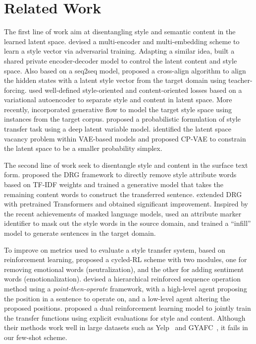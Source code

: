 \section{Related Work}
\label{sec:related}
The first line of work aim at disentangling style and semantic content in the learned latent space. \citet{fu2018style} devised a multi-encoder and multi-embedding scheme to learn a style vector via adversarial training. Adapting a similar idea, \citet{zhang2018shaped} built a shared private encoder-decoder model to control the latent content and style space. Also based on a seq2seq model, \citet{shen2017style} proposed a cross-align algorithm to align the hidden states with a latent style vector from the target domain using teacher-forcing.  \citet{john2018disentangled} used well-defined style-oriented and content-oriented losses based on a variational autoencoder to separate style and content in latent space. More recently, \citet{Yi2019} incorporated generative flow to model the target style space using instances from the target corpus. \citet{he2020probabilistic} proposed a probabilistic formulation of style transfer task using a deep latent variable model. \citet{Xu2019} identified the latent space vacancy problem within VAE-based models and proposed CP-VAE to constrain the latent space to be a smaller probability simplex.

The second line of work seek to disentangle style and content in the surface text form. \citet{li2018delete} proposed the DRG framework to directly remove style attribute words based on TF-IDF weights and trained a generative model that takes the remaining content words to construct the transferred sentence. \citet{Sudhakar2020} extended DRG with pretrained Transformers and obtained significant improvement. Inspired by the recent achievements of masked language models, \citet{wu2019mask} used an attribute marker identifier to mask out the style words in the source domain, and trained a ``infill'' model to generate sentences in the target domain.

To improve on metrics used to evaluate a style transfer system, based on reinforcement learning, \citet{xu2018unpaired} proposed a cycled-RL scheme with two modules, one for removing emotional words (neutralization), and the other for adding sentiment words (emotionalization). \citet{wu2019hierarchical} devised a hierarchical reinforced sequence operation method using a \emph{point-then-operate} framework, with a high-level agent proposing the position in a sentence to operate on, and a low-level agent altering the proposed positions. \citet{luo2019dual} proposed a dual reinforcement learning model to jointly train the transfer functions using explicit evaluations for style and content. Although their methods work well in large datasets such as Yelp~\citep{asghar2016yelp} and GYAFC~\citep{rao2018dear}, it fails in our few-shot scheme.

